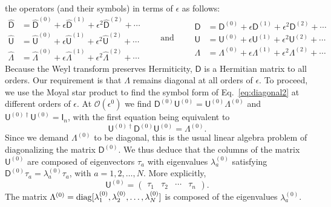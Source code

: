 the operators (and their symbols) in terms of $\epsilon$ as follows:
%
\begin{equation}
  \begin{aligned}
    \widehat{\mathsf{D}} &= \widehat{\mathsf{D}}^{(0)} + \epsilon\widehat{\mathsf{D}}^{(1)} + \epsilon^{2}\widehat{\mathsf{D}}^{(2)} + \cdots\\
    \widehat{\mathsf{U}} &= \widehat{\mathsf{U}}^{(0)} + \epsilon\widehat{\mathsf{U}}^{(1)} + \epsilon^{2}\widehat{\mathsf{U}}^{(2)} + \cdots\\
    \widehat{\Lambda} &= \widehat{\Lambda}^{(0)} + \epsilon\widehat{\Lambda}^{(1)} + \epsilon^{2}\widehat{\Lambda}^{(2)} + \cdots
  \end{aligned}
  \qquad\text{and}\qquad
  \begin{aligned}
    {\mathsf{D}} &= {\mathsf{D}}^{(0)} + \epsilon{\mathsf{D}}^{(1)} + \epsilon^{2}{\mathsf{D}}^{(2)} + \cdots\\
    {\mathsf{U}} &= {\mathsf{U}}^{(0)} + \epsilon{\mathsf{U}}^{(1)} + \epsilon^{2}{\mathsf{U}}^{(2)} + \cdots\\
    {\Lambda} &= {\Lambda}^{(0)} + \epsilon{\Lambda}^{(1)} + \epsilon^{2}{\Lambda}^{(2)} + \cdots
  \end{aligned}
\end{equation}
%
Because the Weyl transform preserves Hermiticity, $\mathsf{D}$ is a Hermitian matrix to all orders.
Our requirement is that $\Lambda$ remains diagonal at all orders of $\epsilon$.
To proceed, we use the Moyal star product to find the symbol form of Eq.~\eqref{eq:diagonal2} at different orders of $\epsilon$.
At $\mathcal{O}(\epsilon^0)$ we find $\mathsf{D}^{(0)}\mathsf{U}^{(0)} = \mathsf{U}^{(0)}\Lambda^{(0)}$ and $\mathsf{U}^{(0)\dagger}\mathsf{U}^{(0)} = \mathsf{I}_{n}$, with the first equation being equivalent to
%
\begin{equation}
  \mathsf{U}^{(0)\dagger}\mathsf{D}^{(0)}\mathsf{U}^{(0)} = \Lambda^{(0)}.\label{eq:omega0}
\end{equation}
%
Since we demand $\Lambda^{(0)}$ to be diagonal, this is the usual linear algebra problem of diagonalizing the matrix $\mathsf{D}^{(0)}$.
We thus deduce that the columns of the matrix $\mathsf{U}^{(0)}$ are composed of eigenvectors $\tau_{a}$ with eigenvalues $\lambda^{(0)}_{a}$ satisfying $\mathsf{D}^{(0)}\tau_{a} = \lambda^{(0)}_{a}\tau_{a}$, with $a = 1,2,\ldots,N$.
More explicitly,
%
\begin{equation}
  \mathsf{U}^{(0)} =
  \begin{pmatrix}
    \tau_{1} & \tau_{2} & \cdots & \tau_{n}
  \end{pmatrix}.
\end{equation}
%
The matrix $\Lambda^{(0)} = \operatorname{diag}[\lambda_{1}^{(0)}, \lambda_{2}^{(0)}, \ldots, \lambda_{N}^{(0)}]$ is composed of the eigenvalues $\lambda_{a}^{(0)}$.

